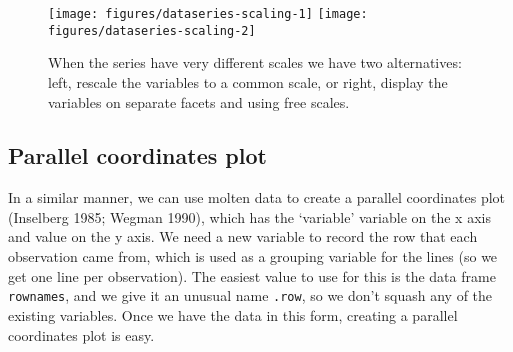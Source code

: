 \begin{Shaded}
\begin{Highlighting}[]
\StringTok{ }
  \StringTok{ } \NormalTok{)}
  \StringTok{ }\NormalTok{rng[}\NormalTok{]) /}\StringTok{ }
\NormalTok{\}}
\StringTok{ } 
  \NormalTok{, }
    
  \NormalTok{) +}\StringTok{ }
\StringTok{  }\StringTok{ } \NormalTok{)}
\end{Highlighting}
\end{Shaded}

\begin{figure}

{\centering \texttt{[image: figures/dataseries-scaling-1]} \texttt{[image: figures/dataseries-scaling-2]} 

}

\caption{When the series have very different scales we have two alternatives: left, rescale the variables to a common scale, or right, display the variables on separate facets and using free scales.\label{fig:series-scaling}}
\end{figure}

\subsection{Parallel coordinates plot}\label{sub:molten-data}

In a similar manner, we can use molten data to create a parallel
coordinates plot (Inselberg 1985; Wegman 1990), which has the `variable'
variable on the x axis and value on the y axis. We need a new variable
to record the row that each observation came from, which is used as a
grouping variable for the lines (so we get one line per observation).
The easiest value to use for this is the data frame \texttt{rownames},
and we give it an unusual name \texttt{.row}, so we don't squash any of
the existing variables. Once we have the data in this form, creating a
parallel coordinates plot is easy. 

